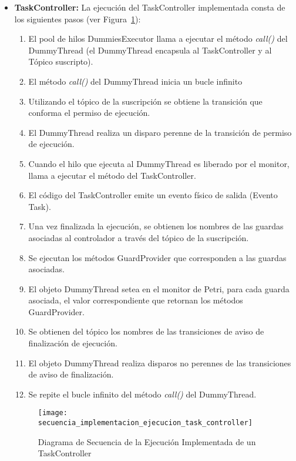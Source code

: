 \begin{itemize}
  \item \textbf{TaskController: } La ejecución del TaskController implementada
  consta de los siguientes pasos (ver
  Figura~\ref{fig:diagrama_secuencia_implementacion_ejecucion_task_controller}):
  	\begin{enumerate}
  	  \item El pool de hilos DummiesExecutor llama a ejecutar el método
  	  \emph{call()} del DummyThread (el DummyThread encapsula al TaskController y
  	  al Tópico suscripto).
  	  \item El método \emph{call()} del DummyThread inicia un bucle infinito
  	  \item Utilizando el tópico de la suscripción se obtiene la transición que
  	  conforma el permiso de ejecución.
  	  \item El DummyThread realiza un disparo perenne de la transición de permiso
  	  de ejecución.
  	  \item Cuando el hilo que ejecuta al DummyThread es liberado por el
  	  monitor, llama a ejecutar el método del TaskController.
  	  \item El código del TaskController emite un evento físico de salida
  	  (Evento Task).
  	  \item Una vez finalizada la ejecución, se obtienen los nombres de las guardas asociadas al
  	  controlador a través del tópico de la suscripción.
  	  \item Se ejecutan los métodos GuardProvider que corresponden a las guardas
  	  asociadas. 
  	  \item El objeto DummyThread setea en el monitor de Petri, para cada guarda asociada, el valor
  	  correspondiente que retornan los métodos GuardProvider.
  	  \item Se obtienen del tópico los nombres de las transiciones de aviso de
  	  finalización de ejecución.
  	  \item El objeto DummyThread realiza disparos no perennes de las
  	  transiciones de aviso de finalización.
  	  \item Se repite el bucle infinito del método \emph{call()} del DummyThread.
  	\end{enumerate}
  	
\begin{figure}[H]
	\hspace{-2,90cm}
	\texttt{[image: secuencia\_implementacion\_ejecucion\_task\_controller]}
	\caption{Diagrama de Secuencia de la Ejecución Implementada de un
	TaskController}
	\label{fig:diagrama_secuencia_implementacion_ejecucion_task_controller}
\end{figure}


\end{itemize}

